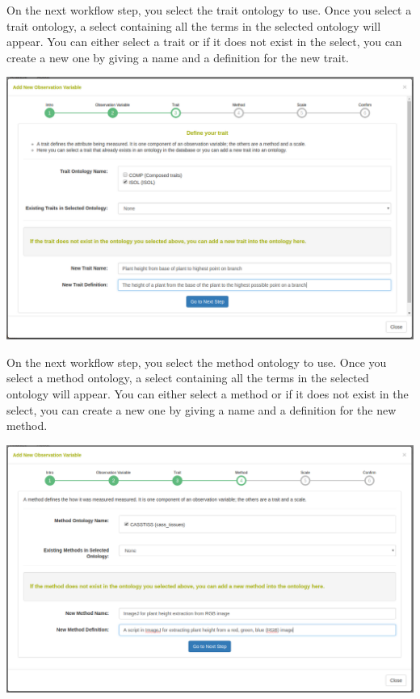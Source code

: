 \documentclass[
  12pt,
]{book}
\begin{document}
On the next workflow step, you select the trait ontology to use. Once you select a trait ontology, a select containing all the terms in the selected ontology will appear. You can either select a trait or if it does not exist in the select, you can create a new one by giving a name and a definition for the new trait.

\begin{center}\includegraphics[width=0.95\linewidth]{assets/images/manage_observation_variables_workflow_trait} \end{center}

On the next workflow step, you select the method ontology to use. Once you select a method ontology, a select containing all the terms in the selected ontology will appear. You can either select a method or if it does not exist in the select, you can create a new one by giving a name and a definition for the new method.

\begin{center}\includegraphics[width=0.95\linewidth]{assets/images/manage_observation_variables_workflow_method} \end{center}
\end{document}
